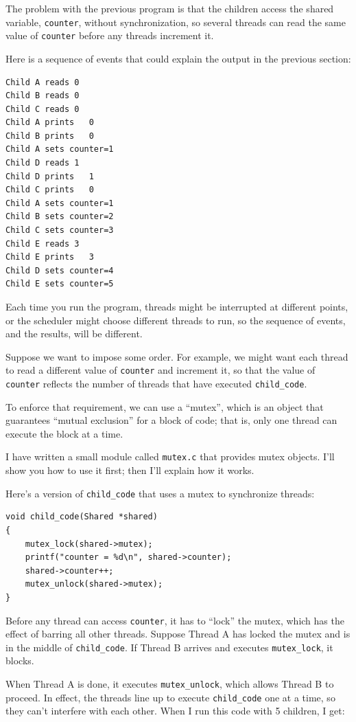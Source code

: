 \documentclass[12pt]{book}
\begin{document}
The problem with the previous program is that the children
access the shared variable, {\tt counter}, without synchronization,
so several threads can read the same value of {\tt counter} before
any threads increment it.

Here is a sequence of events that could explain the output in the
previous section:

\begin{verbatim}
Child A reads 0
Child B reads 0
Child C reads 0
Child A prints   0
Child B prints   0
Child A sets counter=1
Child D reads 1
Child D prints   1
Child C prints   0
Child A sets counter=1
Child B sets counter=2
Child C sets counter=3
Child E reads 3
Child E prints   3
Child D sets counter=4
Child E sets counter=5
\end{verbatim}

Each time you run the program, threads might be interrupted at different
points, or the scheduler might choose different threads to run, so
the sequence of events, and the results, will be different.

Suppose we want to impose some order.  For example, we might want
each thread to read a different value of {\tt counter} and increment
it, so that the value of {\tt counter} reflects the number of
threads that have executed \verb"child_code".

To enforce that requirement, we can use a ``mutex'', which is
an object that guarantees ``mutual exclusion'' for a block of code;
that is, only one thread can execute the block at a time.

I have written a small module called {\tt mutex.c} that provides
mutex objects.  I'll show you how to use it first; then I'll explain
how it works.

Here's a version of \verb"child_code" that uses a mutex to synchronize
threads:

\begin{verbatim}
void child_code(Shared *shared)
{
    mutex_lock(shared->mutex);
    printf("counter = %d\n", shared->counter);
    shared->counter++;
    mutex_unlock(shared->mutex);
}
\end{verbatim}

Before any thread can access {\tt counter}, it has to ``lock''
the mutex, which has the effect of barring all other threads.
Suppose Thread A has locked the mutex and is in the
middle of \verb"child_code".  If Thread B arrives and
executes \verb"mutex_lock", it blocks.

When Thread A is done, it executes \verb"mutex_unlock",
which allows Thread B to proceed.  In effect, the threads
line up to execute \verb"child_code" one at a time, so they
can't interfere with each other.  When I run this code with
5 children, I get:
\end{document}
